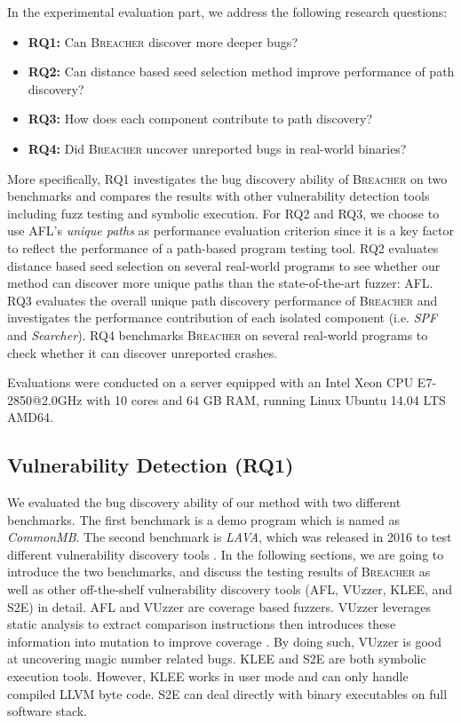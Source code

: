 \documentclass{cta-author}
\newcommand{\prototype}{\textsc{Breacher} }
\begin{document}
In the experimental evaluation part, we address the following 
research questions:
\begin{itemize}
	\setlength{\itemsep}{0pt}
	\item {\textbf{RQ1:} Can \prototype discover more deeper bugs?}
	\item {\textbf{RQ2:} Can distance based seed selection method 
		improve performance of path discovery?}
	\item {\textbf{RQ3:} How does each component contribute to 
		path discovery?}
	\item {\textbf{RQ4:} Did \prototype uncover unreported bugs in real-world binaries?}
\end{itemize}

More specifically, RQ1 investigates the bug discovery ability of 
\prototype on two benchmarks and compares the results with other vulnerability 
detection tools including fuzz testing and symbolic execution.
For RQ2 and RQ3, we choose to use AFL's \textit{unique paths} as performance evaluation criterion since it is a key factor to reflect the 
performance of a path-based program testing tool.
RQ2 evaluates distance based seed selection on several 
real-world programs to see whether our method can discover more 
unique paths than the state-of-the-art fuzzer: AFL. RQ3 evaluates 
the overall unique path discovery performance of \prototype and 
investigates the performance contribution of each isolated 
component (i.e. \textit{SPF} and \textit{Searcher}). RQ4 benchmarks
\prototype on several real-world programs to check whether it can
discover unreported crashes.

Evaluations were conducted on a server equipped
with an Intel Xeon CPU E7-2850@2.0GHz with
10 cores and 64 GB RAM, running Linux Ubuntu 14.04 LTS AMD64.

\subsection{Vulnerability Detection (RQ1)}\label{sec:RQ1}
We evaluated the bug discovery ability of our method with two 
different benchmarks. The first benchmark is a demo program 
which is named as \emph{CommonMB}. 
The second benchmark is \emph{LAVA}, which was released in 2016 
to test different vulnerability discovery tools \cite{dolan2016lava}. 
In the following sections, we are going to introduce the 
two benchmarks, and discuss the testing results of \prototype
as well as other off-the-shelf vulnerability discovery tools 
(AFL, VUzzer, KLEE, and S2E) in detail. AFL and VUzzer are coverage
based fuzzers. VUzzer leverages static analysis to extract comparison
instructions then introduces these information into mutation to improve coverage
\cite{rawat2017vuzzer}. By doing such, VUzzer is good at uncovering magic number
related bugs. KLEE and S2E are both symbolic execution tools. However, KLEE works
in user mode and can only handle compiled LLVM byte code. S2E can deal 
directly with binary executables on full software stack.
\end{document}
